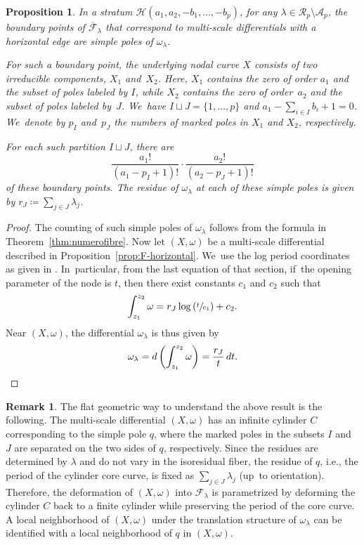 \documentclass[11pt]{article}
\newcommand{\ie}{i.e.,\xspace}
\newtheorem{prop}[thm]{Proposition}
\theoremstyle{definition}
\newtheorem{rmk}[thm]{Remark}
\begin{document}
\begin{prop}\label{prop:simple-pole}
In a stratum $\mathcal{H}(a_{1},a_{2},-b_{1},\dots,-b_{p})$, for any $\lambda \in \mathcal{R}_{p} \setminus \mathcal{A}_{p}$, the boundary points of $\overline{\mathcal{F}}_{\lambda}$ that correspond to multi-scale differentials with a horizontal edge are simple poles of $\omega_{\lambda}$.

For such a boundary point, the underlying nodal curve $X$ consists of two irreducible components, $X_1$ and~$X_2$. Here, $X_1$ contains the zero of order $a_1$ and the subset of poles labeled by $I$, while $X_2$ contains the zero of order~$a_2$ and the subset of poles labeled by~$J$. We~have $I\sqcup J = \{1,\ldots,p\}$ and $a_1 - \sum_{i \in I} b_i + 1 = 0$. We~denote by $p_{I}$ and~$p_{J}$ the numbers of marked poles in $X_{1}$ and $X_{2}$, respectively.

For each such partition $I \sqcup J$, there are
\begin{equation}
\frac{a_{1}!}{(a_{1}-p_{I}+1)!} \cdot \frac{a_{2}!}{(a_{2}-p_{J}+1)!}
\end{equation}
of these boundary points. The residue of $\omega_{\lambda}$ at each of these simple poles is given by $r_{J}\coloneqq\sum_{j \in J} \lambda_{j}$.
\end{prop}

\begin{proof}
The counting of such simple poles of $\omega_\lambda$ follows from the formula in Theorem~\ref{thm:numerofibre}. Now let $(X,\omega)$ be a multi-scale differential described in Proposition~\ref{prop:F-horizontal}. We~use the log period coordinates as given in \cite[\S\S10.10 \&~13.3]{BCGGM2}. In~particular, from the last equation of that section, if~the opening parameter of the node is $t$, then there exist constants $c_{1}$ and $c_{2}$ such that
\[
\int_{z_{1}}^{z_{2}}\omega = r_{J}\log\left(\sfrac{t}{c_{1}}\right) + c_{2} .
\]
Near $(X,\omega)$, the differential $\omega_{\lambda}$ is thus given by
\[
\omega_{\lambda} = d\left(\int_{z_{1}}^{z_{2}}\omega\right)=\frac{r_{J}}{t}\,dt.\qedhere
\]
\end{proof}

\begin{rmk}
The flat geometric way to understand the above result is the following. The multi-scale differential $(X,\omega)$ has an infinite cylinder $C$ corresponding to the simple pole $q$, where the marked poles in the subsets $I$ and $J$ are separated on the two sides of $q$, respectively. Since the residues are determined by $\lambda$ and do not vary in the isoresidual fiber, the residue of $q$, \ie the period of the cylinder core curve, is fixed as $\sum_{j \in J} \lambda_{j}$ (up~to orientation). Therefore, the deformation of $(X,\omega)$ into $\mathcal F_\lambda$ is parametrized by deforming the cylinder $C$ back to a finite cylinder while preserving the period of the core curve. A local neighborhood of $(X,\omega)$ under the translation structure of $\omega_\lambda$ can be identified with a local neighborhood of $q$ in $(X,\omega)$.
\end{rmk}
\end{document}
